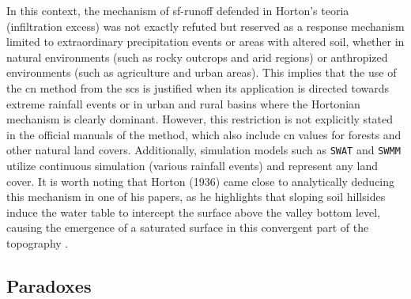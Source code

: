 \documentclass[./main_en.tex]{subfiles}
\begin{document}
\par In this context, the mechanism of \gls{sf-runoff} defended in Horton’s \gls{teoria} (infiltration excess) was not exactly refuted but reserved as a response mechanism limited to extraordinary precipitation events or areas with altered soil, whether in natural environments (such as rocky outcrops and arid regions) or anthropized environments (such as agriculture and urban areas). This implies that the use of the \acrshort{cn} method from the \acrshort{scs} is justified when its application is directed towards extreme rainfall events or in urban and rural basins where the Hortonian mechanism is clearly dominant. However, this restriction is not explicitly stated in the official manuals of the method, which also include \acrshort{cn} values for forests and other natural land covers. Additionally, simulation models such as \texttt{SWAT} and \texttt{SWMM} utilize continuous simulation (various rainfall events) and represent any land cover. It is worth noting that Horton (1936) \cite{Horton1936} came close to analytically deducing this mechanism in one of his papers, as he highlights that sloping soil hillsides induce the water table to intercept the surface above the valley bottom level, causing the emergence of a saturated surface in this convergent part of the topography \cite{Beven2004b}.

\subsection{Paradoxes}
\end{document}
